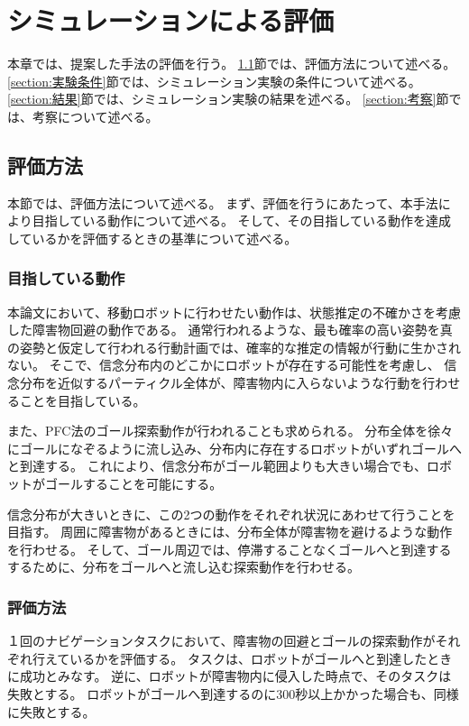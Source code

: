 \chapter{シミュレーションによる評価} \label{chapter:evaluate}
本章では、提案した手法の評価を行う。
\ref{section:評価方法}節では、評価方法について述べる。
\ref{section:実験条件}節では、シミュレーション実験の条件について述べる。
\ref{section:結果}節では、シミュレーション実験の結果を述べる。
\ref{section:考察}節では、考察について述べる。

\section{評価方法} \label{section:評価方法}
本節では、評価方法について述べる。
まず、評価を行うにあたって、本手法により目指している動作について述べる。
そして、その目指している動作を達成しているかを評価するときの基準について述べる。

\subsection{目指している動作}
本論文において、移動ロボットに行わせたい動作は、状態推定の不確かさを考慮した障害物回避の動作である。
通常行われるような、最も確率の高い姿勢を真の姿勢と仮定して行われる行動計画では、確率的な推定の情報が行動に生かされない。
そこで、信念分布内のどこかにロボットが存在する可能性を考慮し、
信念分布を近似するパーティクル全体が、障害物内に入らないような行動を行わせることを目指している。

また、PFC法のゴール探索動作が行われることも求められる。
分布全体を徐々にゴールになぞるように流し込み、分布内に存在するロボットがいずれゴールへと到達する。
これにより、信念分布がゴール範囲よりも大きい場合でも、ロボットがゴールすることを可能にする。

信念分布が大きいときに、この2つの動作をそれぞれ状況にあわせて行うことを目指す。
周囲に障害物があるときには、分布全体が障害物を避けるような動作を行わせる。
そして、ゴール周辺では、停滞することなくゴールへと到達するするために、分布をゴールへと流し込む探索動作を行わせる。

\subsection{評価方法}
１回のナビゲーションタスクにおいて、障害物の回避とゴールの探索動作がそれぞれ行えているかを評価する。
タスクは、ロボットがゴールへと到達したときに成功とみなす。
逆に、ロボットが障害物内に侵入した時点で、そのタスクは失敗とする。
ロボットがゴールへ到達するのに300秒以上かかった場合も、同様に失敗とする。

